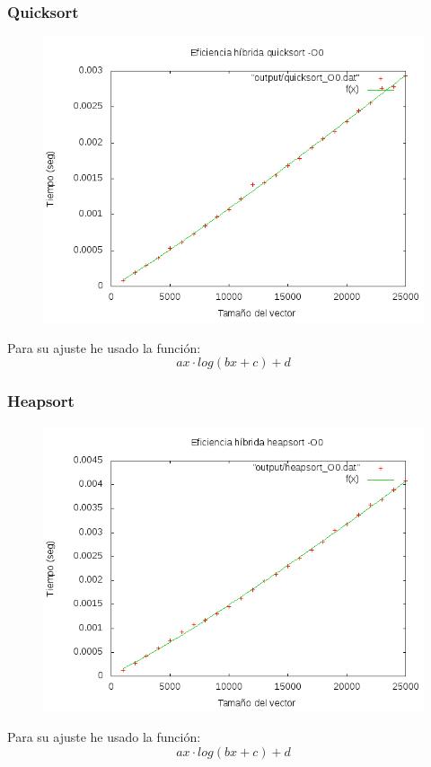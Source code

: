\documentclass[spanish]{beamer}
\begin{document}
   \begin{frame}\frametitle{Quicksort}
    \begin{figure}[H]
    \centering   
    \includegraphics[clip,width=0.76\columnwidth]{../../plots/quicksort_O0_fit.png}%
    \end{figure}

    Para su ajuste he usado la función: $$ax\cdot log(bx +c)+d$$
       
  \end{frame}

   \begin{frame}\frametitle{Heapsort}
    \begin{figure}[H]
    \centering   
    \includegraphics[clip,width=0.76\columnwidth]{../../plots/heapsort_O0_fit.png}%
    \end{figure}

    Para su ajuste he usado la función: $$ax\cdot log(bx +c)+d$$
       
  \end{frame}
\end{document}
